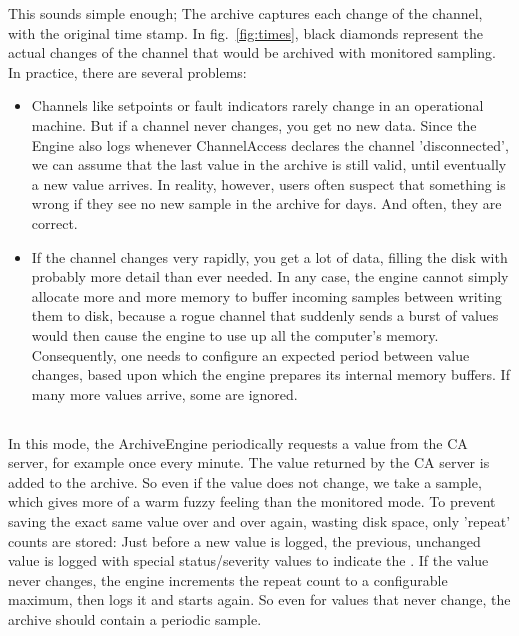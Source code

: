 \noindent This sounds simple enough; The archive captures each change of the channel,
with the original time stamp.
In fig.~\ref{fig:times}, black diamonds represent the actual changes of the
channel that would be archived with monitored sampling.
In practice, there are several problems:
\begin{itemize}
\item Channels like setpoints or fault indicators rarely change in an
      operational machine.
      But if a channel never changes, you get no new data.
      Since the Engine also logs whenever ChannelAccess declares the
      channel 'disconnected', we can assume that the last value in the archive
      is still valid, until eventually a new value arrives.
      In reality, however, users often suspect that something is wrong if they
      see no new sample in the archive for days.
      And often, they are correct.
\item If the channel changes very rapidly, you get a lot of data, filling the
      disk with probably more detail than ever needed.
      In any case, the engine cannot simply
      allocate more and more memory to buffer incoming samples between
      writing them to disk, because a rogue channel that suddenly sends
      a burst of values would then cause the engine to use up all the computer's
      memory. Consequently, one needs to configure an expected period
      between value changes, based upon which the engine prepares its
      internal memory buffers. If many more values arrive, some are ignored.
\end{itemize}

\subsection{}
In this mode, the ArchiveEngine periodically requests a value from
the CA server, for example once every minute. The value returned by
the CA server is added to the archive. So even if the value does not
change, we take a sample, which gives more of a warm fuzzy feeling than
the monitored mode.
To prevent saving the exact same value over and over again, wasting disk space,
only 'repeat' counts are stored: Just before a new value is logged, the
previous, unchanged value is logged with special status/severity values
to indicate the .
If the value never changes, the engine increments the repeat count
to a configurable maximum, then logs it and starts again.
So even for values that never change, the archive should contain
a periodic sample.

